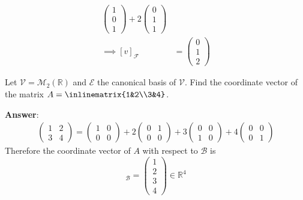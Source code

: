 \begin{exm}
\begin{align*}
\begin{pmatrix}
			1 \\0\\1
		\end{pmatrix}+
		2\begin{pmatrix}
			0 \\1\\1
		\end{pmatrix}                              \\
		\implies
		[v]_\mathcal{F}            & =\begin{pmatrix}
			0 \\1\\2
		\end{pmatrix}
	\end{align*}
\end{exm}

\begin{exm}
	Let $\mathcal{V}=\mathcal{M}_2(\mathbb{R})$ and $\mathcal{E}$ the canonical
	basis of $\mathcal{V}$. Find the coordinate vector of the matrix
	$A=\inlinematrix{1&2\\3&4}$.
	\begin{flushleft}
		\textbf{Answer}:
		\begin{align*}
			\begin{pmatrix}
				1 & 2 \\
				3 & 4
			\end{pmatrix}=
			\begin{pmatrix}
				1 & 0 \\
				0 & 0
			\end{pmatrix}+
			2\begin{pmatrix}
				0 & 1 \\
				0 & 0
			\end{pmatrix}+
			3\begin{pmatrix}
				0 & 0 \\
				1 & 0
			\end{pmatrix}+
			4\begin{pmatrix}
				0 & 0 \\
				0 & 1
			\end{pmatrix}
		\end{align*}
		Therefore the coordinate vector of $A$ with respect to $\mathcal{B}$ is
		\begin{equation*}
			[A]_\mathcal{B}=\begin{pmatrix}
				1 \\2\\3\\4
			\end{pmatrix}\in\mathbb{R}^4
		\end{equation*}
	\end{flushleft}
\end{exm}

